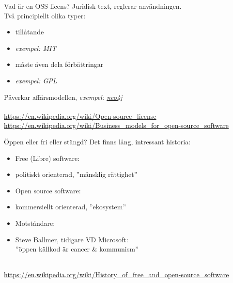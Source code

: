 \documentclass{simpleslides}
\begin{document}
\begin{Slide}{Vad är en OSS-licens?}
Juridisk text, reglerar användningen.\\Två principiellt olika typer: 
  \begin{itemize}
    \item tillåtande \hfill {}
    \item [] \emph{exempel: MIT}
    \item måste även dela förbättringar \hfill {}
    \item [] \emph{exempel: GPL}
  \end{itemize}
  Påverkar affärsmodellen, \emph{exempel: \href{https://sv.wikipedia.org/wiki/Neo4j}{neo4j}}\\
{\fontsize{8}{10}\selectfont ~\\
\href{https://en.wikipedia.org/wiki/Open-source_license}{https://en.wikipedia.org/wiki/Open-source\_license} \\
\href{https://en.wikipedia.org/wiki/Business_models_for_open-source_software}{https://en.wikipedia.org/wiki/Business\_models\_for\_open-source\_software}
}
\end{Slide}

\begin{Slide}{Öppen eller fri eller stängd?}
Det finns lång, intressant historia: 
  \begin{itemize}
    \item Free (Libre) software:
    \item[] politiskt orienterad, ''mänsklig rättighet'' 
    \item Open source software:
    \item[] kommersiellt orienterad, ''ekosystem''
    \item Motståndare:
    \item[] Steve Ballmer, tidigare VD Microsoft: \\ ''öppen källkod är cancer \& kommunism''  
  \end{itemize}
  {\fontsize{8}{10}\selectfont ~\\
\href{https://en.wikipedia.org/wiki/History_of_free_and_open-source_software}{https://en.wikipedia.org/wiki/History\_of\_free\_and\_open-source\_software} \\
}
\end{Slide}
\end{document}
